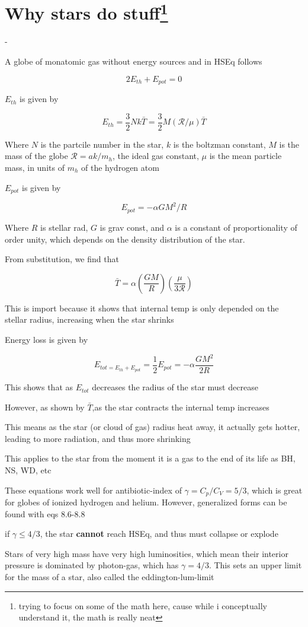 \section{Why stars do stuff\footnote{trying to focus on some of the math here, cause while i conceptually understand it, the math is really neat}}
\begin{list}{-}{}
\item A globe of monatomic gas without energy sources and in HSEq follows
\item \[2E_{th} + E_{pot} = 0\]
\item \(E_{th}\) is given by 
\item \[E_{th} = \frac{3}{2}Nk\bar{T} = \frac{3}{2}M(\mathcal{R}/\mu)\bar{T}\]
\item Where \(N\) is the partcile number in the star, \(k\) is the boltzman constant, \(M\) is the mass of the globe \(\mathcal{R} = ak/m_h\), the ideal gas constant, \(\mu\) is the mean particle mass, in units of \(m_h\) of the hydrogen atom 
\item \(E_{pot}\) is given by 
\item \[E_{pot} = -\alpha GM^2/R\] 
\item Where \(R\) is stellar rad, \(G\) is grav const, and \(\alpha\) is a constant of proportionality of order unity, which depends on the density distribution of the star.
\item From substitution, we find that
\item \[\bar{T} = \alpha(\frac{GM}{R}) (\frac{\mu}{3\mathcal{R}})\]
\item This is import because it shows that internal temp is only depended on the stellar radius, increasing when the star shrinks
\item Energy loss is given by 
\item \[E_{tot = E_{th} + E_{pot}} = \frac{1}{2}E_{pot} = -\alpha \frac{GM^2}{2R}\] 
\item This shows that as \(E_{tot}\) decreases the radius of the star must decrease
\item However, as shown by \(\bar{T}\),as the star contracts the internal temp increases
\item This means as the star (or cloud of gas) radius heat away, it actually gets hotter, leading to more radiation, and thus more shrinking
\item This applies to the star from the moment it is a gas to the end of its life as BH, NS, WD, etc
\item These equations work well for \gls{antibiotic-index} of  \(\gamma = C_p/C_V = 5/3\), which is great for globes of ionized hydrogen and helium. However, generalized forms can be found with eqs 8.6-8.8
\item if \(\gamma \leq 4/3\), the star \textbf{cannot} reach HSEq, and thus must collapse or explode
\item Stars of very high mass have very high luminosities, which mean their interior pressure is dominated by \gls{photon-gas}, which has \(\gamma = 4/3\). This sets an upper limit for the mass of a star, also called the \gls{eddington-lum-limit}
\end{list}

